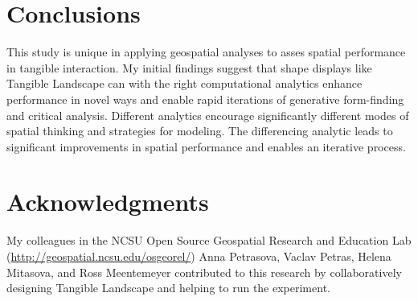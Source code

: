 \documentclass{sigchi}
\begin{document}



\section{Conclusions}

This study is unique in applying geospatial analyses 
to asses spatial performance in tangible interaction.
My initial findings suggest that 
shape displays like Tangible Landscape can 
with the right computational analytics
enhance performance in novel ways
and enable rapid iterations of generative form-finding and critical analysis.
Different analytics encourage 
significantly different modes of spatial thinking 
and strategies for modeling. 
The differencing analytic leads to significant improvements 
in spatial performance and enables an iterative process. 







\section{Acknowledgments}
My colleagues 
in the NCSU Open Source Geospatial Research and Education Lab
(\url{http://geospatial.ncsu.edu/osgeorel/})
Anna Petrasova, Vaclav Petras, Helena Mitasova, and Ross Meentemeyer 
contributed to this research by
collaboratively designing Tangible Landscape and 
helping to run the experiment.
\end{document}
